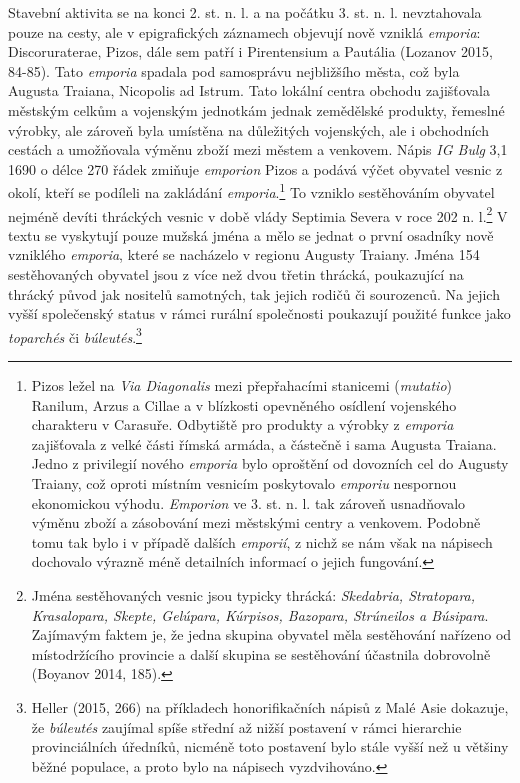 Stavební aktivita se na konci 2. st. n. l. a na počátku 3. st. n. l. nevztahovala pouze na cesty, ale v epigrafických záznamech objevují nově vzniklá {\em emporia}: Discoruraterae, Pizos, dále sem patří i Pirentensium a Pautália (Lozanov 2015, 84-85). Tato {\em emporia} spadala pod samosprávu nejbližšího města, což byla Augusta Traiana, Nicopolis ad Istrum. Tato lokální centra obchodu zajišťovala městským celkům a vojenským jednotkám jednak zemědělské produkty, řemeslné výrobky, ale zároveň byla umístěna na důležitých vojenských, ale i obchodních cestách a umožňovala výměnu zboží mezi městem a venkovem. Nápis {\em IG Bulg} 3,1 1690 o délce 270 řádek zmiňuje {\em emporion} Pizos a podává výčet obyvatel vesnic z okolí, kteří se podíleli na zakládání {\em emporia}.\footnote{Pizos ležel na {\em Via Diagonalis} mezi přepřahacími stanicemi ({\em mutatio}) Ranilum, Arzus a Cillae a v blízkosti opevněného osídlení vojenského charakteru v Carasuře. Odbytiště pro produkty a výrobky z {\em emporia} zajišťovala z velké části římská armáda, a částečně i sama Augusta Traiana. Jedno z privilegií nového {\em emporia} bylo oproštění od dovozních cel do Augusty Traiany, což oproti místním vesnicím poskytovalo {\em emporiu} nespornou ekonomickou výhodu. {\em Emporion} ve 3. st. n. l. tak zároveň usnadňovalo výměnu zboží a zásobování mezi městskými centry a venkovem. Podobně tomu tak bylo i v případě dalších {\em emporií}, z nichž se nám však na nápisech dochovalo výrazně méně detailních informací o jejich fungování.} To vzniklo sestěhováním obyvatel nejméně devíti thráckých vesnic v době vlády Septimia Severa v roce 202 n. l.\footnote{Jména sestěhovaných vesnic jsou typicky thrácká: {\em Skedabria, Stratopara, Krasalopara, Skepte, Gelúpara, Kúrpisos, Bazopara, Strúneilos a Búsipara}. Zajímavým faktem je, že jedna skupina obyvatel měla sestěhování nařízeno od místodržícího provincie a další skupina se sestěhování účastnila dobrovolně (Boyanov 2014, 185).} V textu se vyskytují pouze mužská jména a mělo se jednat o první osadníky nově vzniklého {\em emporia}, které se nacházelo v regionu Augusty Traiany. Jména 154 sestěhovaných obyvatel jsou z více než dvou třetin thrácká, poukazující na thrácký původ jak nositelů samotných, tak jejich rodičů či sourozenců. Na jejich vyšší společenský status v rámci rurální společnosti poukazují použité funkce jako {\em toparchés} či {\em búleutés}.\footnote{Heller (2015, 266) na příkladech honorifikačních nápisů z Malé Asie dokazuje, že {\em búleutés} zaujímal spíše střední až nižší postavení v rámci hierarchie provinciálních úředníků, nicméně toto postavení bylo stále vyšší než u většiny běžné populace, a proto bylo na nápisech vyzdvihováno.}

